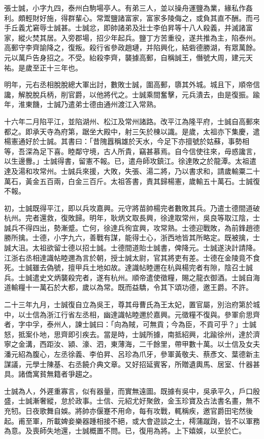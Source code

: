 張士誠，小字九四，泰州白駒場亭人。有弟三人，並以操舟運鹽為業，緣私作姦利。頗輕財好施，得群輩心。常鬻鹽諸富家，富家多陵侮之，或負其直不酬。而弓手丘義尤窘辱士誠甚。士誠忿，即帥諸弟及壯士李伯昇等十八人殺義，并滅諸富家，縱火焚其居。入旁郡場，招少年起兵。鹽丁方苦重役，遂共推為主，陷泰州。高郵守李齊諭降之，復叛。殺行省參政趙璉，并陷興化，結砦德勝湖，有眾萬餘。元以萬戶告身招之。不受。紿殺李齊，襲據高郵，自稱誠王，僭號大周，建元天祐。是歲至正十三年也。

明年，元右丞相脫脫總大軍出討，數敗士誠，圍高郵，隳其外城。城且下，順帝信讒，解脫脫兵柄，削官爵，以他將代之。士誠乘間奮擊，元兵潰去，由是復振。踰年，淮東饑，士誠乃遣弟士德由通州渡江入常熟。

十六年二月陷平江，並陷湖州、松江及常州諸路。改平江為隆平府，士誠自高郵來都之。即承天寺為府第，踞坐大殿中，射三矢於棟以識。是歲，太祖亦下集慶，遣楊憲通好於士誠。其書曰：「昔隗囂稱雄於天水，今足下亦擅號於姑蘇，事勢相等，吾深為足下喜。睦鄰守境，古人所貴，竊甚慕焉。自今信使往來，毋惑讒言，以生邊釁。」士誠得書，留憲不報。已，遣舟師攻鎮江。徐達敗之於龍潭。太祖遣達及湯和攻常州。士誠兵來援，大敗，失張、湯二將，乃以書求和，請歲輸粟二十萬石，黃金五百兩，白金三百斤。太祖答書，責其歸楊憲，歲輸五十萬石。士誠復不報。

初，士誠既得平江，即以兵攻嘉興。元守將苗帥楊完者數敗其兵。乃遣士德間道破杭州。完者還救，復敗歸。明年，耿炳文取長興，徐達取常州，吳良等取江陰，士誠兵不得四出，勢漸蹙。亡何，徐達兵徇宜興，攻常熟。士德迎戰敗，為前鋒趙德勝所擒。士德，小字九六，善戰有謀，能得士心，浙西地皆其所略定。既被擒，士誠大沮。太祖欲留士德以招士誠。士德間道貽士誠書，俾降元。士誠遂決計請降。江浙右丞相達識帖睦邇為言於朝，授士誠太尉，官其將吏有差。士德在金陵竟不食死。士誠雖去偽號，擅甲兵土地如故。達識帖睦邇在杭與楊完者有隙，陰召士誠兵。士誠遣史文炳襲殺完者，遂有杭州。順帝遣使徵糧，賜之龍衣御酒。士誠自海道輸糧十一萬石於大都，歲以為常。既而益驕，令其下頌功德，邀王爵。不許。

二十三年九月，士誠復自立為吳王，尊其母曹氏為王太妃，置官屬，別治府第於城中，以士信為浙江行省左丞相，幽達識帖睦邇於嘉興。元徵糧不復與。參軍俞思齊者，字中孚，泰州人，諫士誠曰：「向為賊，可無貢；今為臣，不貢可乎？」士誠怒，抵案仆地，思齊即引疾去。當是時，士誠所據，南抵紹興，北踰徐州，達於濟寧之金溝，西距汝、潁、濠、泗，東薄海，二千餘里，帶甲數十萬。以士信及女夫潘元紹為腹心，左丞徐義、李伯昇、呂珍為爪牙，參軍黃敬夫、蔡彥文、葉德新主謀議，元學士陳基、右丞饒介典文章。又好招延賓客，所贈遺輿馬、居室、什器甚具。諸僑寓貧無籍者爭趨之。

士誠為人，外遲重寡言，似有器量，而實無遠圖。既據有吳中，吳承平久，戶口殷盛，士誠漸奢縱，怠於政事。士信、元紹尤好聚斂，金玉珍寶及古法書名畫，無不充牣。日夜歌舞自娛。將帥亦偃蹇不用命，每有攻戰，輒稱疾，邀官爵田宅然後起。甫至軍，所載婢妾樂器踵相接不絕，或大會遊談之士，樗蒲蹴踘，皆不以軍務為意。及喪師失地還，士誠概置不問。已，復用為將。上下嬉娛，以至於亡。


